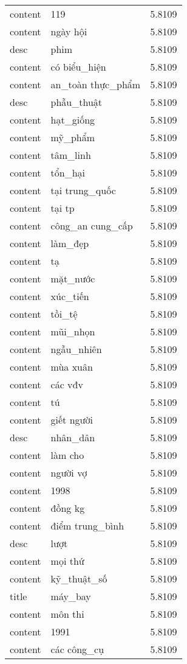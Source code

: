 \documentclass{article}
\begin{document}
\begin{tabular}{lll}
content & 119 & 5.8109\\
content & ngày hội & 5.8109\\
desc & phim & 5.8109\\
content & có biểu\_hiện & 5.8109\\
content & an\_toàn thực\_phẩm & 5.8109\\
desc & phẫu\_thuật & 5.8109\\
content & hạt\_giống & 5.8109\\
content & mỹ\_phẩm & 5.8109\\
content & tâm\_linh & 5.8109\\
content & tổn\_hại & 5.8109\\
content & tại trung\_quốc & 5.8109\\
content & tại tp & 5.8109\\
content & công\_an cung\_cấp & 5.8109\\
content & làm\_đẹp & 5.8109\\
content & tạ & 5.8109\\
content & mặt\_nước & 5.8109\\
content & xúc\_tiến & 5.8109\\
content & tồi\_tệ & 5.8109\\
content & mũi\_nhọn & 5.8109\\
content & ngẫu\_nhiên & 5.8109\\
content & mùa xuân & 5.8109\\
content & các vđv & 5.8109\\
content & tú & 5.8109\\
content & giết người & 5.8109\\
desc & nhân\_dân & 5.8109\\
content & làm cho & 5.8109\\
content & người vợ & 5.8109\\
content & 1998 & 5.8109\\
content & đồng kg & 5.8109\\
content & điểm trung\_bình & 5.8109\\
desc & lượt & 5.8109\\
content & mọi thứ & 5.8109\\
content & kỹ\_thuật\_số & 5.8109\\
title & máy\_bay & 5.8109\\
content & môn thi & 5.8109\\
content & 1991 & 5.8109\\
content & các công\_cụ & 5.8109\\

\end{tabular}
\end{document}
